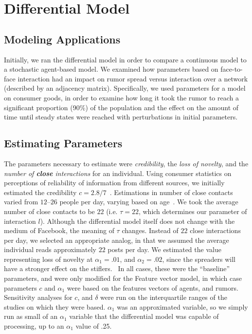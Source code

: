 \section{Differential Model }
\label{sec:diffmodel}

\subsection{Modeling Applications}
\label{subsec:diffmodeapp}

Initially, we ran the differential model in order to compare a continuous model to a stochastic agent-based model.
We examined how parameters based on face-to-face interaction had an impact on rumor spread versus interaction over a network (described by an adjacency matrix).
Specifically, we used parameters for a model on consumer goods, in order to examine how long it took the rumor to reach a significant proportion (90\%) of the population and the effect on the amount of time until steady states were reached with perturbations in initial parameters.

\subsection{Estimating Parameters}
\label{subsec:diffmodeeparam}

The parameters necessary to estimate were \textit{credibility}, the
\textit{loss of novelty}, and the \textit{number of \textbf{close} interactions} for an individual.
Using consumer statistics on perceptions of reliability of information from different sources, we initially estimated the credibility $ c = 2.8/7 $~\cite{kamins-1997}.
Estimations in number of close contacts varied from $ 12 $--$ 26 $ people per day, varying based on age~\cite{cahill-1996, mossong-2008, edmunds-2006}.
We took the average number of close contacts to be $ 22 $ (i.e. $ \tau = 22 $, which determines our parameter of interaction $ l $).
Although the differential model itself does not change with the medium of Facebook, the meaning of $ \tau $ changes.
Instead of $ 22 $ close interactions per day, we selected an appropriate analog, in that we assumed the average individual reads approximately $ 22 $ posts per day.
We estimated the value representing loss of novelty at $ \alpha_1 = .01 $, and  $ \alpha_2 = .02 $, since the spreaders will have a stronger effect on the stiflers.
\
In all cases, these were the ``baseline'' parameters, and were only modified for the Feature vector model, in which case parameters $ c $ and $ \alpha_1 $  were based on the features vectors of agents, and rumors.
Sensitivity analyses for $ c $, and $ \delta $ were run on the interquartile ranges of the studies on which they were based.
$ \alpha_1 $ was an approximated variable, so we simply run as small of an $ \alpha_1 $ variable that the differential model was capable of processing, up to an $ \alpha_1 $ value of .25.
